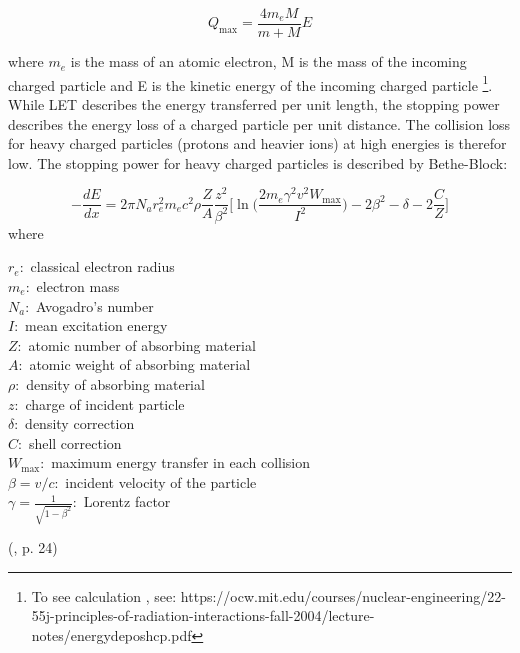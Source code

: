 \begin{equation} \label{eq:collision_E_transfer}
    Q_\text{max}=\frac{4m_eM}{m+M}E
\end{equation}

where $m_e$ is the mass of an atomic electron, M is the mass of the incoming charged particle and E is the kinetic energy of the incoming charged particle \footnote{To see calculation , see: https://ocw.mit.edu/courses/nuclear-engineering/22-55j-principles-of-radiation-interactions-fall-2004/lecture-notes/energydeposhcp.pdf}. While LET describes the energy transferred per unit length, the stopping power describes the energy loss of a charged particle per unit distance. The collision loss for heavy charged particles (protons and heavier ions) at high energies is therefor low. The stopping power for heavy charged particles is described by Bethe-Block: 

\begin{equation}
    -\frac{dE}{dx} = 2\pi N_a r_e^2 m_e c^2\rho \frac{Z}{A}\frac{z^2}{\beta^2}\Big[\ln \Big( \frac{2m_e\gamma^2v^2W_\text{max}}{I^2} \Big)-2\beta^2 -\delta -2\frac{C}{Z} \Big]
\end{equation}
where
\begin{multicols}{2}
\noindent
$r_e: $ classical electron radius\\
$m_e: $ electron mass\\
$N_a: $ Avogadro's number \\
$I: $ mean excitation energy \\
$Z: $ atomic number of absorbing material\\
$A: $ atomic weight of absorbing material \\
$\rho: $ density of absorbing material \\
$z: $ charge of incident particle \\
$\delta: $ density correction \\
$C: $ shell correction\\ 
$W_\text{max}: $ maximum energy transfer in each collision\\
$\beta=v/c:$ incident velocity of the particle\\
$\gamma=\frac{1}{\sqrt{1-\beta^2}}: $ Lorentz factor

\end{multicols}

(\cite{Leo1994}, p. 24)

